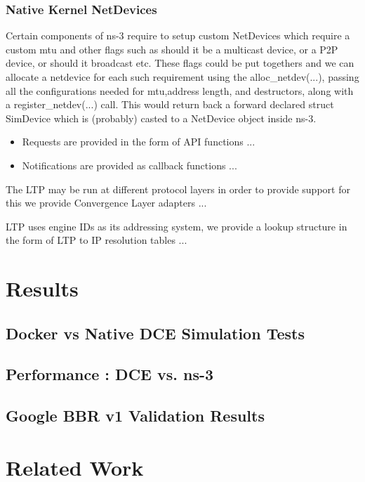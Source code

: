\documentclass{sig-alternate}
\begin{document}
\subsubsection{Native Kernel NetDevices}
Certain components of ns-3 require to setup custom NetDevices which require a custom mtu and other flags such as should it be a multicast device, 
or a P2P device, or should it broadcast etc. These flags could be put togethers and we can allocate a netdevice for each such requirement using 
the alloc\_netdev(...), passing all the configurations needed for mtu,address length, and destructors, along with a register\_netdev(...) call.
This would return back a forward declared struct SimDevice which is (probably)  casted to a NetDevice object inside ns-3. 


\begin{itemize}
 \item Requests are provided in the form of API functions ...
 \item Notifications are provided as callback functions ...
\end{itemize}

The LTP may be run at different protocol layers in order to provide support for this
we provide Convergence Layer adapters ...

LTP uses engine IDs as its addressing system, we provide a lookup structure in the form of LTP to IP resolution tables ...


\section{Results}

\subsection{Docker vs Native DCE Simulation Tests}

\subsection{Performance : DCE vs. ns-3}

\subsection{Google BBR v1 Validation Results}

\section{Related Work}
\end{document}
